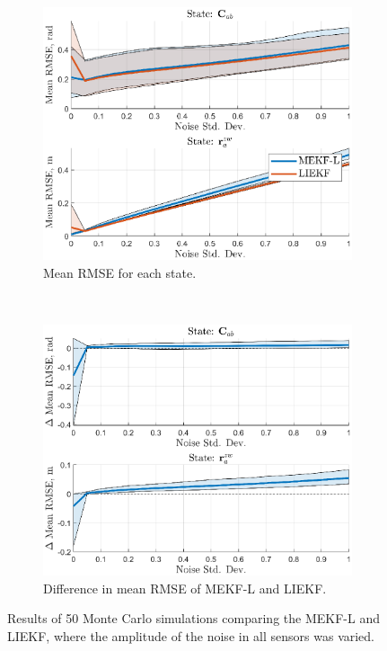 \begin{figure}
	\centering
	\begin{subfigure}[b]{0.5\textwidth}
		\includegraphics[width=\textwidth]{figs/se3/noise_trials/comp_noise_rmse_state_All_L.eps}
		\caption{Mean RMSE for each state.}
	\end{subfigure}
	~
	\begin{subfigure}[b]{0.5\textwidth}
		\includegraphics[width=\textwidth]{figs/se3/noise_trials/comp_noise_diff_state_All_L.eps}
		\caption{Difference in mean RMSE of MEKF-L and LIEKF.}
	\end{subfigure}
	\caption[Results comparing the MEKF-L and LIEKF varying all sensor noise.]{Results of 50 Monte Carlo simulations comparing the MEKF-L and LIEKF, where the amplitude of the noise in all sensors was varied. }
	\label{fig:comp_noise_all_L}
\end{figure}

